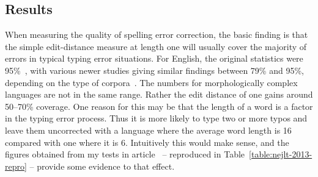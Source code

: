 \documentclass[officiallayout,final]{unihelcompling}
\begin{document}
\subsection{Results}

When measuring the quality of spelling error correction, the basic finding is
that the simple edit-distance measure at length one will usually cover the
majority of errors in typical typing error situations. For English, the original
statistics were 95\%~\citep{damerau1964technique}, with various newer studies
giving similar findings between 79\% and 95\%, depending on the type of
corpora~\citep{kukich1992spelling}.  The numbers for morphologically complex
languages are not in the same range. Rather the edit distance of one gains
around 50--70\% coverage. One reason for this may be that the length of a word
is a factor in the typing error process. Thus it is more likely to type two or
more typos and leave them uncorrected with a language where the average word
length is 16 compared with one where it is 6. Intuitively this would make
sense, and the figures obtained from my tests in
article~ -- reproduced in
Table~\ref{table:nejlt-2013-repro} -- provide some evidence to that effect.
\end{document}
